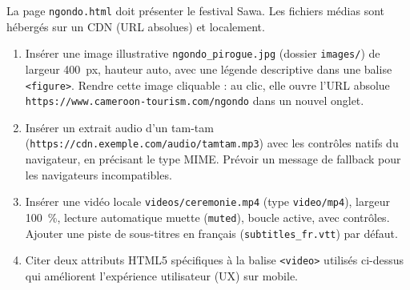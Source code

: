 \documentclass[11pt]{article}
\begin{document}
\begin{exercice}
La page \texttt{ngondo.html} doit présenter le festival Sawa. Les fichiers médias sont hébergés sur un CDN (URL absolues) et localement.
\begin{enumerate}
    \item Insérer une image illustrative \texttt{ngondo\_pirogue.jpg} (dossier \texttt{images/}) de largeur \SI{400}{px}, hauteur auto, avec une légende descriptive dans une balise \texttt{<figure>}. Rendre cette image cliquable : au clic, elle ouvre l'URL absolue \texttt{https://www.cameroon-tourism.com/ngondo} dans un nouvel onglet.
    \item Insérer un extrait audio d'un tam-tam (\texttt{https://cdn.exemple.com/audio/tamtam.mp3}) avec les contrôles natifs du navigateur, en précisant le type MIME. Prévoir un message de fallback pour les navigateurs incompatibles.
    \item Insérer une vidéo locale \texttt{videos/ceremonie.mp4} (type \texttt{video/mp4}), largeur \SI{100}{\%}, lecture automatique muette (\texttt{muted}), boucle active, avec contrôles. Ajouter une piste de sous-titres en français (\texttt{subtitles\_fr.vtt}) par défaut.
    \item Citer deux attributs HTML5 spécifiques à la balise \texttt{<video>} utilisés ci-dessus qui améliorent l'expérience utilisateur (UX) sur mobile.
\end{enumerate}
\end{exercice}
\end{document}
